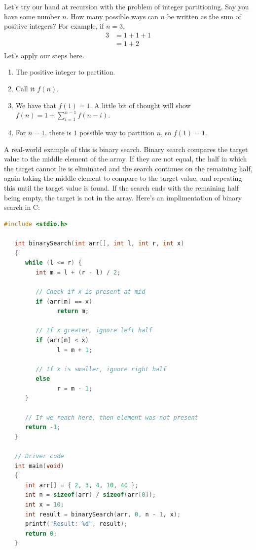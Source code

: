 \documentclass[nobib]{tufte-handout}
\begin{document}
Let's try our hand at recursion with the problem of integer partitioning. 
Say you have some number $n$. How many possible ways can $n$ be written 
as the sum of positive integers? For example, if $n=3$, 
\begin{align*}
   3 &= 1 + 1 + 1 \\
   &= 1 + 2 \\
\end{align*}
Let's apply our steps here. 
\begin{enumerate}
   \item The positive integer to partition. 
   \item Call it $f(n)$.
   \item We have that $f(1) = 1$. A little bit of thought will show 
   $f(n) = 1 + \sum_{i=1}^{n-1} f(n-i)$.
   \item For $n=1$, there is $1$ possible way to partition $n$, 
   so $f(1) = 1$. 
\end{enumerate}

A real-world example of this is binary search. Binary search 
compares the target value to the middle element of the array. 
If they are not equal, the half in which the target cannot 
lie is eliminated and the search continues on the remaining half, 
again taking the middle element to compare to the target value, 
and repeating this until the target value is found. If the search 
ends with the remaining half being empty, the target is 
not in the array. Here's an implimentation of binary search in C: 
\begin{lstlisting}[language=C,caption=Binary search]
   #include <stdio.h>
 
   int binarySearch(int arr[], int l, int r, int x)
   {
      while (l <= r) {
         int m = l + (r - l) / 2;
   
         // Check if x is present at mid
         if (arr[m] == x)
               return m;
   
         // If x greater, ignore left half
         if (arr[m] < x)
               l = m + 1;
   
         // If x is smaller, ignore right half
         else
               r = m - 1;
      }
   
      // If we reach here, then element was not present
      return -1;
   }
   
   // Driver code
   int main(void)
   {
      int arr[] = { 2, 3, 4, 10, 40 };
      int n = sizeof(arr) / sizeof(arr[0]);
      int x = 10;
      int result = binarySearch(arr, 0, n - 1, x);
      printf("Result: %d", result);
      return 0;
   }
\end{lstlisting}
\end{document}
